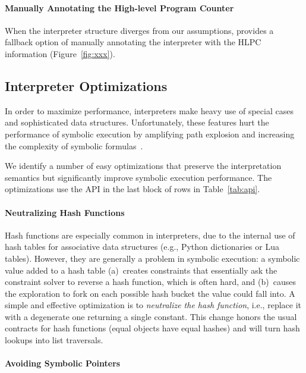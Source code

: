 \paragraph{Manually Annotating the High-level Program Counter}

When the interpreter structure diverges from our assumptions, \chef provides a fallback option of manually annotating the interpreter with the HLPC information (Figure~\ref{fig:xxx}).

\subsection{Interpreter Optimizations}
\label{sec:chef:optimzeforsymbex}

In order to maximize performance, interpreters make heavy use of special cases and sophisticated data structures.  Unfortunately, these features hurt the performance of symbolic execution by amplifying path explosion and increasing the complexity of symbolic formulas~\cite{overify}.

We identify a number of easy optimizations that preserve the interpretation semantics but significantly improve symbolic execution performance.  The optimizations use the \chef API in the last block of rows in Table~\ref{tab:api}.

\paragraph{Neutralizing Hash Functions}

Hash functions are especially common in interpreters, due to the internal use of hash tables for associative data structures (e.g., Python dictionaries or Lua tables).  However, they are generally a problem in symbolic execution: a symbolic value added to a hash table (a)~creates constraints that essentially ask the constraint solver to reverse a hash function, which is often hard, and (b)~causes the exploration to fork on each possible hash bucket the value could fall into.
%
A simple and effective optimization is to \emph{neutralize the hash function}, i.e., replace it with a degenerate one returning a single constant. This change honors the usual contracts for hash functions (equal objects have equal hashes) and will turn hash lookups into list traversals.

\paragraph{Avoiding Symbolic Pointers}

